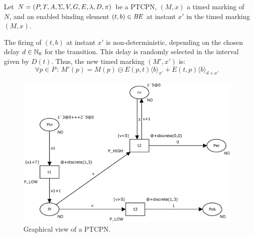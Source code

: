 \begin{definition} 
Let $N=(P,T,A,\Sigma,V,G,E,\lambda,D,\pi)$ be a PTCPN,
$(M,x)$ a timed marking of $N$, and an enabled
binding element $(t,b) \in {\it BE}$ at 
instant $x'$ in the timed marking $(M,x)$.

The firing of $(t,b)$ at instant $x'$ is non-deterministic,
depending on the chosen delay $d \in \mathbb{N}_{0}$ for the transition.
This delay is randomly selected in the interval given by $D(t)$. 
Thus, the new timed marking $(M',x')$ is: 
%
\[
  \forall p \in P\,:\,
  M'(p) = M(p) \ominus E(p,t)\langle b \rangle_{x'} + E(t,p)\langle b
 \rangle_{d+x'}
\]
%
\end{definition}

\begin{figure}


\hspace*{1.0cm}
\includegraphics[width=11.5cm]{Figures/figure2_scp.eps}
% 
\caption{\label{red1}Graphical view of a PTCPN.}
\end{figure}

